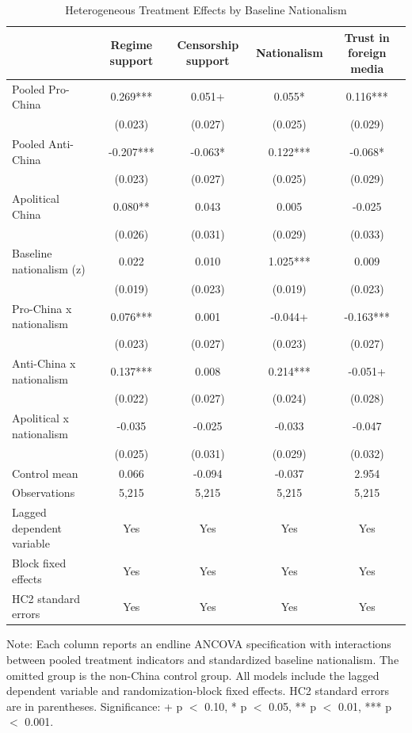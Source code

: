 \begin{table}[H]
\centering
\caption{Heterogeneous Treatment Effects by Baseline Nationalism}
\label{tab:het_nat_t1}
\footnotesize
\begin{threeparttable}
\begin{tabular}{lcccc}
\toprule
 & Regime support & Censorship support & Nationalism & Trust in foreign media \\
\midrule
Pooled Pro-China & 0.269*** & 0.051+ & 0.055* & 0.116*** \\
 & (0.023) & (0.027) & (0.025) & (0.029) \\
\addlinespace
Pooled Anti-China & -0.207*** & -0.063* & 0.122*** & -0.068* \\
 & (0.023) & (0.027) & (0.025) & (0.029) \\
\addlinespace
Apolitical China & 0.080** & 0.043 & 0.005 & -0.025 \\
 & (0.026) & (0.031) & (0.029) & (0.033) \\
\addlinespace
Baseline nationalism (z) & 0.022 & 0.010 & 1.025*** & 0.009 \\
 & (0.019) & (0.023) & (0.019) & (0.023) \\
\addlinespace
Pro-China x nationalism & 0.076*** & 0.001 & -0.044+ & -0.163*** \\
 & (0.023) & (0.027) & (0.023) & (0.027) \\
\addlinespace
Anti-China x nationalism & 0.137*** & 0.008 & 0.214*** & -0.051+ \\
 & (0.022) & (0.027) & (0.024) & (0.028) \\
\addlinespace
Apolitical x nationalism & -0.035 & -0.025 & -0.033 & -0.047 \\
 & (0.025) & (0.031) & (0.029) & (0.032) \\
\addlinespace
\midrule
Control mean & 0.066 & -0.094 & -0.037 & 2.954 \\
Observations & 5,215 & 5,215 & 5,215 & 5,215 \\
Lagged dependent variable & Yes & Yes & Yes & Yes \\
Block fixed effects & Yes & Yes & Yes & Yes \\
HC2 standard errors & Yes & Yes & Yes & Yes \\
\bottomrule
\end{tabular}
\begin{tablenotes}[flushleft]
\footnotesize
\item Note: Each column reports an endline ANCOVA specification with interactions between pooled treatment indicators and standardized baseline nationalism. The omitted group is the non-China control group. All models include the lagged dependent variable and randomization-block fixed effects. HC2 standard errors are in parentheses. Significance: + p $<$ 0.10, * p $<$ 0.05, ** p $<$ 0.01, *** p $<$ 0.001.
\end{tablenotes}
\end{threeparttable}
\end{table}
